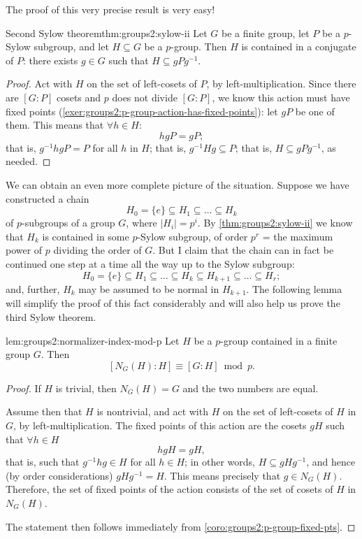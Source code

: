 The proof of this very precise result is very easy!
\begin{thm}{Second Sylow theorem}{thm:groups2:sylow-ii}
  Let $G$ be a finite group, let $P$ be a $p$-Sylow subgroup, and let
  $H \subseteq G$ be a $p$-group. Then $H$ is contained in a conjugate
  of $P$: there exists $g \in G$ such that $H \subseteq gPg^{-1}$.
\end{thm}
\begin{proof}
  Act with $H$ on the set of left-cosets of $P$, by
  left-multiplication. Since there are $[G : P]$ cosets and $p$ does
  not divide $[G : P]$, we know this action must have fixed points
  (\cref{exer:groups2:p-group-action-has-fixed-points}): let $gP$ be
  one of them. This means that $\forall h \in H$:
  \[
    hgP = gP;
  \]
  that is, $g^{-1}hgP = P$ for all $h$ in $H$; that is,
  $g^{-1}Hg \subseteq P$; that is, $H \subseteq gPg^{-1}$, as needed.
\end{proof}
We can obtain an even more complete picture of the situation. Suppose
we have constructed a chain
\[
  H_0 = \{e\} \subseteq H_1 \subseteq \dots \subseteq H_k
\]
of $p$-subgroups of a group $G$, where $|H_i| = p^i$. By
\cref{thm:groups2:sylow-ii} we know that $H_k$ is contained in some
$p$-Sylow subgroup, of order $p^r$ = the maximum power of $p$ dividing
the order of $G$. But I claim that the chain can in fact be continued
one step at a time all the way up to the Sylow subgroup:
\[
  H_0 = \{e\} \subseteq H_1 \subseteq \dots \subseteq H_k \subseteq
  H_{k+1} \subseteq \dots \subseteq H_r;
\]
and, further, $H_k$ may be assumed to be normal in $H_{k+1}$. The
following lemma will simplify the proof of this fact considerably and
will also help us prove the third Sylow theorem.
\begin{lem}{}{lem:groups2:normalizer-index-mod-p}
  Let $H$ be a $p$-group contained in a finite group $G$. Then
  \[ [N_G(H) : H] \equiv [G : H] \bmod p.
  \]
\end{lem}
\begin{proof}
  If $H$ is trivial, then $N_G(H) = G$ and the two numbers are equal.

  Assume then that $H$ is nontrivial, and act with $H$ on the set of
  left-cosets of $H$ in $G$, by left-multiplication. The fixed points
  of this action are the cosets $gH$ such that $\forall h \in H$
  \[
    hgH = gH,
  \]
  that is, such that $g^{-1}hg \in H$ for all $h \in H$; in other
  words, $H \subseteq gHg^{-1}$, and hence (by order considerations)
  $gHg^{-1} = H$.  This means precisely that $g \in
  N_G(H)$. Therefore, the set of fixed points of the action consists
  of the set of cosets of $H$ in $N_G(H)$.

  The statement then follows immediately from
  \cref{coro:groups2:p-group-fixed-pts}.
\end{proof}

